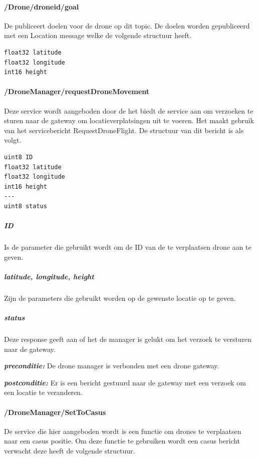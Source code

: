 \documentclass[a4paper, 11pt, oneside]{report}
\begin{document}
\paragraph{/Drone/drone\textunderscore id/goal}
\label{DetailedDesign:ros:extern:rosinterfaces:topic:goal}
De  publiceert doelen voor de drone op dit topic.
De doelen worden gepubliceerd met een Location message welke de volgende structuur heeft.

\begin{lstlisting}
float32 latitude
float32 longitude
int16 height
\end{lstlisting}


\paragraph{/DroneManager/requestDroneMovement}
\label{DetailedDesign:ros:extern:rosinterfaces:service:requestDronemovement}

Deze service wordt aangeboden door de  het biedt de service aan om verzoeken te sturen naar de gateway om locatieverplatsingen uit te voeren. Het maakt gebruik van het servicebericht RequestDroneFlight. De structuur van dit bericht is als volgt.

\begin{lstlisting}
uint8 ID
float32 latitude
float32 longitude
int16 height
---
uint8 status
\end{lstlisting}

\subparagraph{ID} Is de parameter die gebruikt wordt om de ID van de te verplaatsen drone aan te geven.
\subparagraph{latitude, longitude, height} Zijn de parameters die gebruikt worden op de gewenste locatie op te geven.
\subparagraph{status} Deze response geeft aan of het de manager is gelukt om het verzoek te versturen naar de gateway.


\textbf{\textit{preconditie:}} De drone manager is verbonden met een drone gateway. 

\textbf{\textit{postconditie:}} Er is een bericht gestuurd naar de gateway met een verzoek om een locatie te veranderen.

\paragraph{/DroneManager/SetToCasus}
\label{DetailedDesign:ros:extern:rosinterfaces:service:casus}
De service die hier aangeboden wordt is een functie om drones te verplaatsen naar een casus positie.
Om deze functie te gebruiken wordt een casus bericht verwacht deze heeft de volgende structuur.
\end{document}
